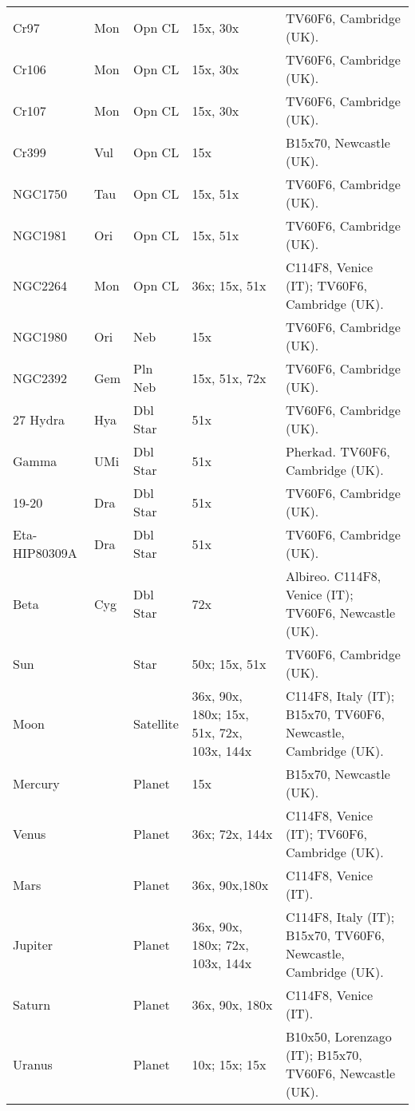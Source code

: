 \begin{longtable}{ p{0.8in}  p{0.3in}  p{0.5in}  p{0.9in}  p{5.8in} }
Cr97 & Mon & Opn CL & 15x, 30x & TV60F6, Cambridge (UK). \\ 
Cr106 & Mon & Opn CL & 15x, 30x & TV60F6, Cambridge (UK). \\ 
Cr107 & Mon & Opn CL & 15x, 30x & TV60F6, Cambridge (UK). \\ 
Cr399 & Vul & Opn CL & 15x & B15x70, Newcastle (UK). \\ 
NGC1750 & Tau & Opn CL & 15x, 51x & TV60F6, Cambridge (UK). \\ 
NGC1981 & Ori & Opn CL & 15x, 51x & TV60F6, Cambridge (UK). \\ 
NGC2264 & Mon & Opn CL & 36x; 15x, 51x & C114F8, Venice (IT); TV60F6, Cambridge (UK). \\ 
NGC1980 & Ori & Neb & 15x & TV60F6, Cambridge (UK). \\ 
NGC2392 & Gem & Pln Neb & 15x, 51x, 72x & TV60F6, Cambridge (UK). \\ 
27 Hydra & Hya & Dbl Star & 51x & TV60F6, Cambridge (UK). \\ 
Gamma & UMi & Dbl Star & 51x & Pherkad. TV60F6, Cambridge (UK). \\ 
19-20 & Dra & Dbl Star & 51x & TV60F6, Cambridge (UK). \\ 
Eta-HIP80309A & Dra & Dbl Star & 51x & TV60F6, Cambridge (UK). \\ 
Beta & Cyg & Dbl Star & 72x & Albireo. C114F8, Venice (IT); TV60F6, Newcastle (UK). \\ 
Sun &  & Star & 50x; 15x, 51x & TV60F6, Cambridge (UK). \\ 
Moon &  & Satellite & 36x, 90x, 180x; 15x, 51x, 72x, 103x, 144x & C114F8, Italy (IT); B15x70, TV60F6, Newcastle, Cambridge (UK). \\ 
Mercury &  & Planet & 15x & B15x70, Newcastle (UK). \\ 
Venus &  & Planet & 36x; 72x, 144x & C114F8, Venice (IT); TV60F6, Cambridge (UK). \\ 
Mars &  & Planet & 36x, 90x,180x & C114F8, Venice (IT). \\ 
Jupiter &  & Planet & 36x, 90x, 180x; 72x, 103x, 144x & C114F8, Italy (IT); B15x70, TV60F6, Newcastle, Cambridge (UK). \\ 
Saturn &  & Planet & 36x, 90x, 180x & C114F8, Venice (IT). \\ 
Uranus &  & Planet & 10x; 15x; 15x & B10x50, Lorenzago (IT); B15x70, TV60F6, Newcastle (UK). \\ 
\hline 
\end{longtable} 
